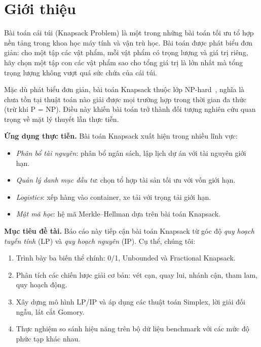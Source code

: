 \section{Giới thiệu}
\label{sec:intro}

Bài toán cái túi (Knapsack Problem) là một trong những bài toán tối ưu tổ hợp nền tảng trong khoa học máy tính và vận trù học. Bài toán được phát biểu đơn giản: cho một tập các vật phẩm, mỗi vật phẩm có trọng lượng và giá trị riêng, hãy chọn một tập con các vật phẩm sao cho tổng giá trị là lớn nhất mà tổng trọng lượng không vượt quá sức chứa của cái túi.

Mặc dù phát biểu đơn giản, bài toán Knapsack thuộc lớp NP-hard~\cite{karp1972reducibility}, nghĩa là chưa tồn tại thuật toán nào giải được mọi trường hợp trong thời gian đa thức (trừ khi P = NP). Điều này khiến bài toán trở thành đối tượng nghiên cứu quan trọng về mặt lý thuyết lẫn thực tiễn.

\textbf{Ứng dụng thực tiễn.} Bài toán Knapsack xuất hiện trong nhiều lĩnh vực:
\begin{itemize}[noitemsep]
    \item \textit{Phân bổ tài nguyên}: phân bổ ngân sách, lập lịch dự án với tài nguyên giới hạn.
    \item \textit{Quản lý danh mục đầu tư}: chọn tổ hợp tài sản tối ưu với vốn giới hạn.
    \item \textit{Logistics}: xếp hàng vào container, xe tải với trọng tải giới hạn.
    \item \textit{Mật mã học}: hệ mã Merkle--Hellman dựa trên bài toán Knapsack.
\end{itemize}

\textbf{Mục tiêu đề tài.} Báo cáo này tiếp cận bài toán Knapsack từ góc độ \textit{quy hoạch tuyến tính} (LP) và \textit{quy hoạch nguyên} (IP). Cụ thể, chúng tôi:
\begin{enumerate}[noitemsep]
    \item Trình bày ba biến thể chính: 0/1, Unbounded và Fractional Knapsack.
    \item Phân tích các chiến lược giải cơ bản: vét cạn, quay lui, nhánh cận, tham lam, quy hoạch động.
    \item Xây dựng mô hình LP/IP và áp dụng các thuật toán Simplex, lời giải đối ngẫu, lát cắt Gomory.
    \item Thực nghiệm so sánh hiệu năng trên bộ dữ liệu benchmark với các mức độ phức tạp khác nhau.
\end{enumerate}


